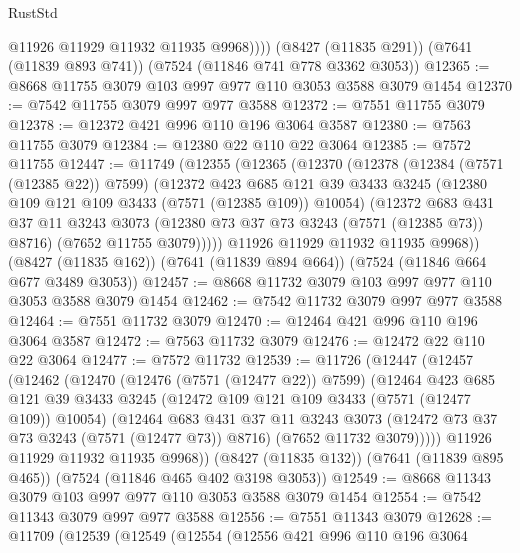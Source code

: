 \begin{lexlean}{RustStd}
\begin{coremodule}
{\begin{coremodule}
{{{{{{{{{{{{{{{{{{{{{{{{{{{{{{{{            @11926
            @11929
            @11932
            @11935
            @9968))))
    (@8427 (@11835 @291))
    (@7641 (@11839 @893 @741))
    (@7524 (@11846 @741 @778 @3362 @3053))
@12365 := @8668 @11755 @3079 @103 @997 @977 @110 @3053 @3588 @3079 @1454
@12370 := @7542 @11755 @3079 @997 @977 @3588
@12372 := @7551 @11755 @3079
@12378 := @12372 @421 @996 @110 @196 @3064 @3587
@12380 := @7563 @11755 @3079
@12384 := @12380 @22 @110 @22 @3064
@12385 := @7572 @11755
@12447 := @11749
    (@12355
      (@12365
        (@12370
          (@12378
            (@12384 (@7571 (@12385 @22)) @7599)
            (@12372
              @423
              @685
              @121
              @39
              @3433
              @3245
              (@12380 @109 @121 @109 @3433 (@7571 (@12385 @109)) @10054)
              (@12372
                @683
                @431
                @37
                @11
                @3243
                @3073
                (@12380 @73 @37 @73 @3243 (@7571 (@12385 @73)) @8716)
                (@7652 @11755 @3079)))))
        @11926
        @11929
        @11932
        @11935
        @9968))
    (@8427 (@11835 @162))
    (@7641 (@11839 @894 @664))
    (@7524 (@11846 @664 @677 @3489 @3053))
@12457 := @8668 @11732 @3079 @103 @997 @977 @110 @3053 @3588 @3079 @1454
@12462 := @7542 @11732 @3079 @997 @977 @3588
@12464 := @7551 @11732 @3079
@12470 := @12464 @421 @996 @110 @196 @3064 @3587
@12472 := @7563 @11732 @3079
@12476 := @12472 @22 @110 @22 @3064
@12477 := @7572 @11732
@12539 := @11726
    (@12447
      (@12457
        (@12462
          (@12470
            (@12476 (@7571 (@12477 @22)) @7599)
            (@12464
              @423
              @685
              @121
              @39
              @3433
              @3245
              (@12472 @109 @121 @109 @3433 (@7571 (@12477 @109)) @10054)
              (@12464
                @683
                @431
                @37
                @11
                @3243
                @3073
                (@12472 @73 @37 @73 @3243 (@7571 (@12477 @73)) @8716)
                (@7652 @11732 @3079)))))
        @11926
        @11929
        @11932
        @11935
        @9968))
    (@8427 (@11835 @132))
    (@7641 (@11839 @895 @465))
    (@7524 (@11846 @465 @402 @3198 @3053))
@12549 := @8668 @11343 @3079 @103 @997 @977 @110 @3053 @3588 @3079 @1454
@12554 := @7542 @11343 @3079 @997 @977 @3588
@12556 := @7551 @11343 @3079
@12628 := @11709
    (@12539
      (@12549
        (@12554
          (@12556
            @421
            @996
            @110
            @196
            @3064
}}}}}}}}}}}}}}}}}}}}}}}}}}}}}}}}
\end{coremodule}}
\end{coremodule}
\end{lexlean}
